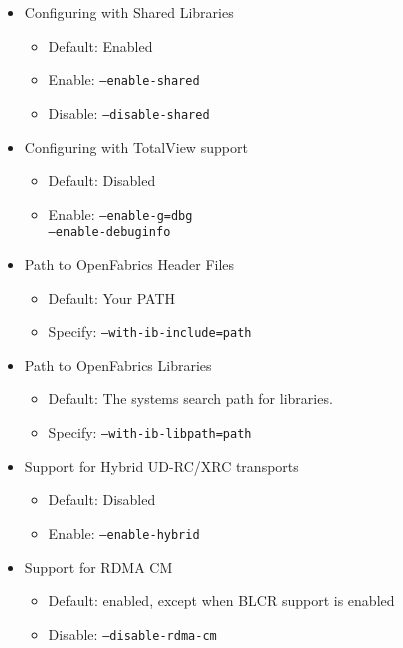 \begin{itemize}
	\item Configuring with Shared Libraries
		\begin{itemize}
			\item Default: Enabled
			\item Enable:  \texttt{--enable-shared}
            \item Disable: \texttt{--disable-shared}
		\end{itemize}

	\item Configuring with TotalView support
		\begin{itemize}
			\item Default: Disabled
			\item Enable: \texttt{--enable-g=dbg \\
				--enable-debuginfo}
		\end{itemize}

	\item Path to OpenFabrics Header Files
		\begin{itemize}
			\item Default: Your PATH
			\item Specify: \texttt{--with-ib-include=path}
		\end{itemize}

	\item Path to OpenFabrics Libraries
		\begin{itemize}
			\item Default: The systems search path for libraries.
			\item Specify: \texttt{--with-ib-libpath=path}
		\end{itemize}

	\item Support for Hybrid UD-RC/XRC transports
        \begin{itemize}
            \item Default: Disabled
            \item Enable:  \texttt{--enable-hybrid}
		\end{itemize}

	\item Support for RDMA CM
		\begin{itemize}
			\item Default: enabled, except when BLCR support is enabled
			\item Disable: \texttt{--disable-rdma-cm}
		\end{itemize}


\end{itemize}
